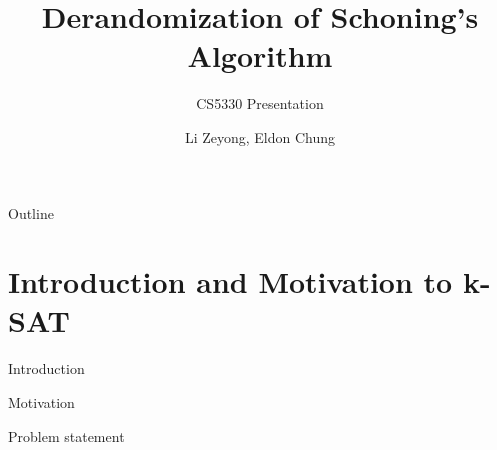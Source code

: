 \documentclass[pdf] {beamer}
\title{Derandomization of Schoning's Algorithm}
\subtitle{CS5330 Presentation}
\author{Li Zeyong, Eldon Chung}
\begin{document}
\begin{frame}
	\titlepage
	
\end{frame}

\begin{frame}{Outline}
	\tableofcontents
\end{frame}

\section{Introduction and Motivation to k-SAT}
	\begin{frame}{Introduction}
	
	\end{frame}
	\begin{frame}{Motivation}
	
	\end{frame}
	\begin{frame}{Problem statement}
	
	\end{frame}
\end{document}
